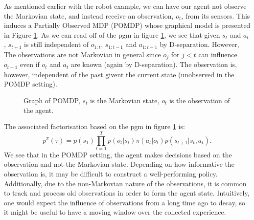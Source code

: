 \documentclass{report}
\numberwithin{equation}{section}
\numberwithin{figure}{section}
\numberwithin{table}{section}
\numberwithin{algorithm}{section}
\begin{document}
As mentioned earlier with the robot example, we can have our agent 
not observe the Markovian state, and instead receive an observation, 
$o_t$, from its sensors. This induces a Partially Observed MDP (POMDP) 
whose graphical model is presented in Figure \ref{fig:POMDP}. As we 
can read off of the pgm in figure \ref{fig:POMDP}, we see that given 
$s_t$ and $a_t$, $s_{t+1}$ is still independent of 
$o_{1:t}$, $s_{1:t-1}$ and $a_{1:t-1}$ by D-separation. However,
The observations are not Markovian in general since $o_j$ for $j<t$ 
can influence $o_{t+1}$ even if $o_t$ and $a_t$ are known (again by 
D-separation). The observation is, however, independent of the past
givent the current state (unobserved in the POMDP setting).

\begin{figure}[H]
  \centering
  \caption{\label{fig:POMDP} Graph of POMDP, $s_t$ is the Markovian 
  state, $o_t$ is the observation of the agent.}
\end{figure}

The associated factorisation based on the pgm in 
figure \ref{fig:POMDP} is:
\begin{equation}
  p^{\pi}(\tau)=p(s_1)\prod_{t=1}^T p(o_t|s_t)\pi(a_t|o_t)p(s_{t+1}|s_t, a_t).
\end{equation}
We see that in the POMDP setting, the agent makes decisions based 
on the observation and not the Markovian state. Depending on how 
informative the observation is, it may be difficult to construct 
a well-performing policy. Additionally, due to the non-Markovian 
nature of the observations, it is common to track and process old 
observations in order to form the agent state. Intuitively, one 
would expect the influence of observations from a long time ago 
to decay, so it might be useful to have a moving window over the 
collected experience.
\end{document}
